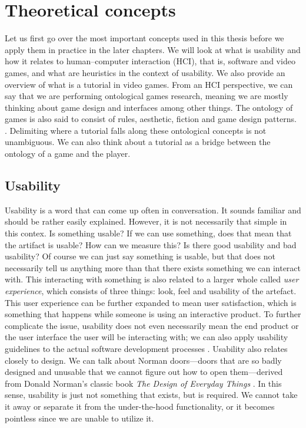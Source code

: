 \chapter{Theoretical concepts}

Let us first go over the most important concepts used in this thesis before we apply them in practice in the later chapters. We will look at what is usability and how it relates to human--computer interaction (HCI), that is, software and video games, and what are heuristics in the context of usability. We also provide an overview of what is a tutorial in video games. From an HCI perspective, we can say that we are performing ontological games research, meaning we are mostly thinking about game design and interfaces among other things. The ontology of games is also said to consist of rules, aesthetic, fiction and game design patterns. \cite{Carter2014}. Delimiting where a tutorial falls along these ontological concepts is not unambiguous. We can also think about a tutorial as a bridge between the ontology of a game and the player.

\section{Usability}
Usability is a word that can come up often in conversation. It sounds familiar and should be rather easily explained. However, it is not necessarily that simple in this contex. Is something usable? If we can use something, does that mean that the artifact is usable? How can we measure this? Is there good usability and bad usability? Of course we can just say something is usable, but that does not necessarily tell us anything more than that there exists something we can interact with. This interacting with something is also related to a larger whole called \textit{user experience}, which consists of three things: look, feel and usability of the artefact. This user experience can be further expanded to mean user satisfaction, which is something that happens while someone is using an interactive product. \cite{Lipp2012} To further complicate the issue, usability does not even necessarily mean the end product or the user interface the user will be interacting with; we can also apply usability guidelines to the actual software development processes \cite{Carvajal2013}. Usability also relates closely to design. We can talk about Norman doors---doors that are so badly designed and unusable that we cannot figure out how to open them---derived from Donald Norman's classic book \textit{The Design of Everyday Things} \cite{Norman2013a}. In this sense, usability is just not something that exists, but is required. We cannot take it away or separate it from the under-the-hood functionality, or it becomes pointless since we are unable to utilize it. 


